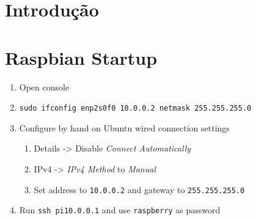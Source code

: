 \documentclass{article}
\begin{document}
{\hypersetup{linkcolor = black} \tableofcontents}
\pagebreak

\section{Introdução}

\section{Raspbian Startup}

\begin{enumerate}
	\item Open console
	\item \texttt{sudo ifconfig enp2s0f0 10.0.0.2 netmask 255.255.255.0}
	\item Configure by hand on Ubuntu wired connection settings
	\begin{enumerate}
		\item Details -> Disable \textit{Connect Automatically}
		\item IPv4 -> \textit{IPv4 Method} to \textit{Manual}
		\item Set address to \texttt{10.0.0.2} and gateway to \texttt{255.255.255.0}
	\end{enumerate}
	\item Run \texttt{ssh pi\@10.0.0.1} and use \texttt{raspberry} as password
\end{enumerate}

\pagebreak
\printbibliography
\end{document}
